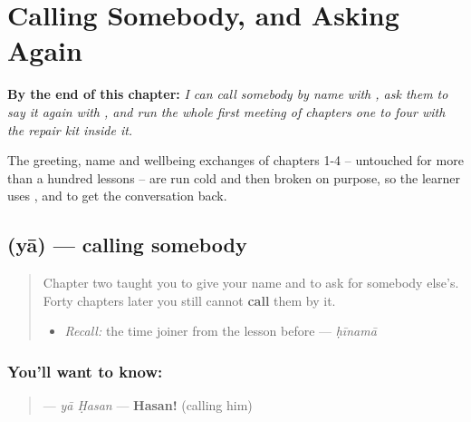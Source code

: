 
\chapter{Calling Somebody, and Asking Again}
\label{ch:ar-calling-somebody-and-asking-again}

\begin{chapteropening}
\textbf{By the end of this chapter:} \emph{I can call somebody by name with , ask them to say it again with   , and run the whole first meeting of chapters one to four with the repair kit inside it.}

The greeting, name and wellbeing exchanges of chapters 1-4 -- untouched for more than a hundred lessons -- are run cold and then broken on purpose, so the learner uses ,   and    to get the conversation back.
\end{chapteropening}

\section[\texorpdfstring{\ar{يا} (yā)}{يا (yā)}]{ (yā) — calling somebody}

\label{lesson:AR-C41-ya}



\begin{quote}
Chapter two taught you to give your name and to ask for somebody else's. Forty chapters later you still cannot \textbf{call} them by it.

\begin{itemize}
\raggedright
  \item \emph{Recall:} the time joiner from the lesson before — \emph{ḥīnamā}
\end{itemize}
\end{quote}

\subsection*{You'll want to know: }
\begin{quote}
\textbf{ } — \emph{yā Ḥasan} — \textbf{Hasan!} (calling him)
\end{quote}

